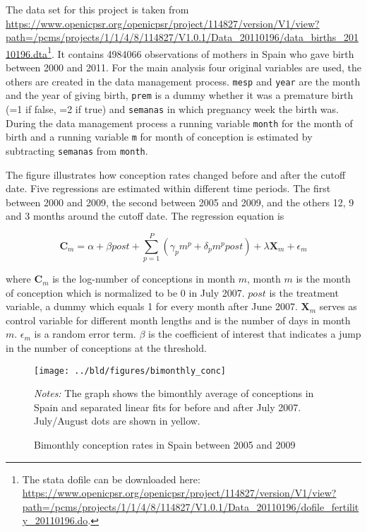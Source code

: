 \documentclass[11pt, a4paper, leqno]{article}
\begin{document}
The data set for this project is taken from
\url{https://www.openicpsr.org/openicpsr/project/114827/version/V1/view?path=/pcms/projects/1/1/4/8/114827/V1.0.1/Data_20110196/data_births_20110196.dta}\footnote{The stata dofile can be downloaded here:
\url{https://www.openicpsr.org/openicpsr/project/114827/version/V1/view?path=/pcms/projects/1/1/4/8/114827/V1.0.1/Data_20110196/dofile_fertility_20110196.do}.}.
It contains 4984066 observations of mothers in Spain who gave birth between 2000 and 2011.
For the main analysis four original variables are used, the others are created in the data management process.
\texttt{mesp} and \texttt{year} are the month and the year of giving birth, \texttt{prem} is a dummy whether it was a premature
birth (=1 if false, =2 if true) and \texttt{semanas} in which pregnancy week the birth was.
During the data management process a running variable \texttt{month} for the month of birth and a running variable \texttt{m}
for month of conception is estimated by subtracting \texttt{semanas} from \texttt{month}.

The figure illustrates how conception rates changed before and after the cutoff date.
Five regressions are estimated within different time periods. The first between 2000 and 2009, the second between 2005 and 2009,
and the others 12, 9 and 3 months around the cutoff date.
The regression equation is

\begin{equation} \label{eq:main}
    \boldsymbol{C}_m= \alpha + \beta post + \sum_{p=1}^{P} (\gamma_p m^p + \delta_p m^p post)  + \lambda \boldsymbol{X}_m + \epsilon_m
\end{equation}

where $\boldsymbol{C}_m$ is the log-number of conceptions in month $m$, month $m$ is the month of conception which is
normalized to be 0 in July 2007. $post$ is the treatment variable, a dummy which equals 1 for every month after June 2007.
$\boldsymbol{X}_m$ serves as control variable for different month lengths and is the number of days in month $m$. $\epsilon_m$
is a random error term. $\beta$ is the coefficient of interest that indicates a jump in the number of conceptions at the threshold.


\begin{figure}[H]

    \centering
    \texttt{[image: ../bld/figures/bimonthly\_conc]}

    \caption{Bimonthly conception rates in Spain between 2005 and 2009}
    \label{fig:conc}
    \begin{footnotesize} \textit{Notes:} The graph shows the bimonthly average of conceptions in Spain and separated linear fits for before
        and after July 2007. July/August dots are shown in yellow.
    \end{footnotesize}

\end{figure}
\end{document}
